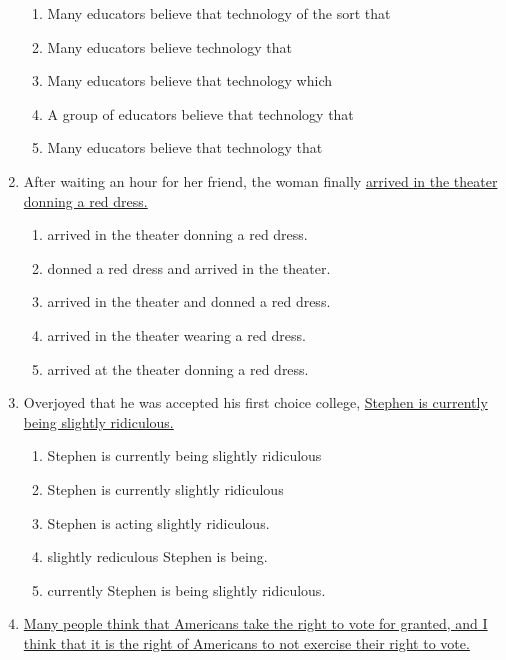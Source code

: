 \begin{enumerate}
\bigskip
\begin{enumerate}[label=(\Alph*)]
\item Many educators believe that technology of the sort that \hrulefill
\item Many educators believe technology that \hrulefill
\item Many educators believe that technology which \hrulefill
\item A group of educators believe that technology that \hrulefill
\item Many educators believe that technology that \hrulefill
\end{enumerate}

\bigskip
\item After waiting an hour for her friend, the woman finally \ul{arrived in the theater donning a red dress.}

\bigskip
\begin{enumerate}[label=(\Alph*)]
\item arrived in the theater donning a red dress.\hrulefill
\item donned a red dress and arrived in the theater. \hrulefill
\item arrived in the theater and donned a red dress. \hrulefill
\item arrived in the theater wearing a red dress.\hrulefill
\item arrived at the theater donning a red dress.\hrulefill
\end{enumerate}

\bigskip
\item Overjoyed that he was accepted his first choice college, \ul{Stephen is currently being slightly ridiculous.}

\bigskip
\begin{enumerate}[label=(\Alph*)]
\item Stephen is currently being slightly ridiculous \hrulefill
\item Stephen is currently slightly ridiculous\hrulefill
\item Stephen is acting slightly ridiculous.\hrulefill
\item slightly rediculous Stephen is being. \hrulefill
\item currently Stephen is being slightly ridiculous.\hrulefill
\end{enumerate}

\bigskip
\item \ul{Many people think that Americans take the right to vote for granted, and I think that it is the right of Americans to not exercise their right to vote.}


\end{enumerate}
